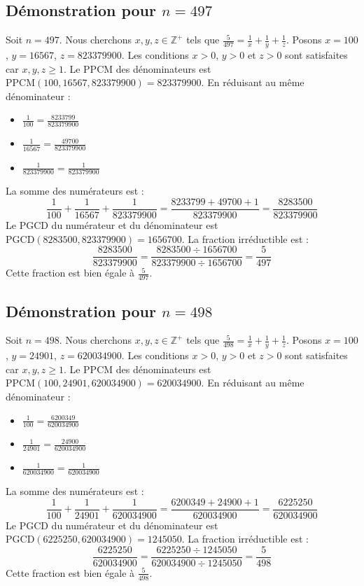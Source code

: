 \documentclass[11pt,a4paper]{article}
\begin{document}
\subsection{Démonstration pour $n = 497$}
Soit $n = 497$. Nous cherchons $x, y, z \in \mathbb{Z}^{+}$ tels que $\frac{5}{497} = \frac{1}{x} + \frac{1}{y} + \frac{1}{z}$.
Posons $x = 100$, $y = 16567$, $z = 823379900$.
Les conditions $x > 0$, $y > 0$ et $z > 0$ sont satisfaites car $x, y, z \geq 1$.
Le PPCM des dénominateurs est $\text{PPCM}(100, 16567, 823379900) = 823379900$.
En réduisant au même dénominateur :
\begin{itemize}
    \item $\frac{1}{100} = \frac{8233799}{823379900}$
    \item $\frac{1}{16567} = \frac{49700}{823379900}$
    \item $\frac{1}{823379900} = \frac{1}{823379900}$
\end{itemize}
La somme des numérateurs est :
$$ \frac{1}{100} + \frac{1}{16567} + \frac{1}{823379900} = \frac{8233799 + 49700 + 1}{823379900} = \frac{8283500}{823379900} $$
Le PGCD du numérateur et du dénominateur est $\text{PGCD}(8283500, 823379900) = 1656700$.
La fraction irréductible est :
$$ \frac{8283500}{823379900} = \frac{8283500 \div 1656700}{823379900 \div 1656700} = \frac{5}{497} $$
Cette fraction est bien égale à $\frac{5}{497}$.

\subsection{Démonstration pour $n = 498$}
Soit $n = 498$. Nous cherchons $x, y, z \in \mathbb{Z}^{+}$ tels que $\frac{5}{498} = \frac{1}{x} + \frac{1}{y} + \frac{1}{z}$.
Posons $x = 100$, $y = 24901$, $z = 620034900$.
Les conditions $x > 0$, $y > 0$ et $z > 0$ sont satisfaites car $x, y, z \geq 1$.
Le PPCM des dénominateurs est $\text{PPCM}(100, 24901, 620034900) = 620034900$.
En réduisant au même dénominateur :
\begin{itemize}
    \item $\frac{1}{100} = \frac{6200349}{620034900}$
    \item $\frac{1}{24901} = \frac{24900}{620034900}$
    \item $\frac{1}{620034900} = \frac{1}{620034900}$
\end{itemize}
La somme des numérateurs est :
$$ \frac{1}{100} + \frac{1}{24901} + \frac{1}{620034900} = \frac{6200349 + 24900 + 1}{620034900} = \frac{6225250}{620034900} $$
Le PGCD du numérateur et du dénominateur est $\text{PGCD}(6225250, 620034900) = 1245050$.
La fraction irréductible est :
$$ \frac{6225250}{620034900} = \frac{6225250 \div 1245050}{620034900 \div 1245050} = \frac{5}{498} $$
Cette fraction est bien égale à $\frac{5}{498}$.
\end{document}

